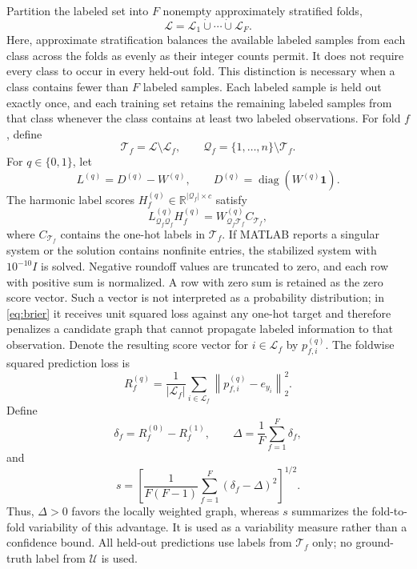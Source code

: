 \documentclass[11pt]{article}
\theoremstyle{remark}
\newcommand{\R}{\mathbb{R}}
\newcommand{\ones}{\mathbf{1}}
\begin{document}
Partition the labeled set into $F$ nonempty approximately stratified folds,
\[
\mathcal L=\mathcal L_1\mathbin{\dot\cup}\cdots\mathbin{\dot\cup}\mathcal L_F.
\]
Here, approximate stratification balances the available labeled samples from each class across the folds as evenly as their integer counts permit. It does not require every class to occur in every held-out fold. This distinction is necessary when a class contains fewer than $F$ labeled samples. Each labeled sample is held out exactly once, and each training set retains the remaining labeled samples from that class whenever the class contains at least two labeled observations.
For fold $f$, define
\[
\mathcal T_f=\mathcal L\setminus\mathcal L_f,
\qquad
\mathcal Q_f=\{1,\ldots,n\}\setminus\mathcal T_f.
\]
For $q\in\{0,1\}$, let
\[
L^{(q)}=D^{(q)}-W^{(q)},
\qquad
D^{(q)}=\operatorname{diag}(W^{(q)}\ones).
\]
The harmonic label scores $H_f^{(q)}\in\R^{|\mathcal Q_f|\times c}$ satisfy
\begin{equation}
\label{eq:harmonic}
L_{\mathcal Q_f\mathcal Q_f}^{(q)}H_f^{(q)}
=W_{\mathcal Q_f\mathcal T_f}^{(q)}C_{\mathcal T_f},
\end{equation}
where $C_{\mathcal T_f}$ contains the one-hot labels in $\mathcal T_f$. If MATLAB reports a singular system or the solution contains nonfinite entries, the stabilized system with $10^{-10}I$ is solved. Negative roundoff values are truncated to zero, and each row with positive sum is normalized. A row with zero sum is retained as the zero score vector. Such a vector is not interpreted as a probability distribution; in \eqref{eq:brier} it receives unit squared loss against any one-hot target and therefore penalizes a candidate graph that cannot propagate labeled information to that observation. Denote the resulting score vector for $i\in\mathcal L_f$ by $p_{f,i}^{(q)}$. The foldwise squared prediction loss is
\begin{equation}
\label{eq:brier}
R_f^{(q)}=
\frac{1}{|\mathcal L_f|}
\sum_{i\in\mathcal L_f}
\left\|p_{f,i}^{(q)}-e_{y_i}\right\|_2^2.
\end{equation}
Define
\begin{equation}
\label{eq:advantage}
\delta_f=R_f^{(0)}-R_f^{(1)},
\qquad
\Delta=\frac{1}{F}\sum_{f=1}^{F}\delta_f,
\end{equation}
and
\begin{equation}
\label{eq:standard_error}
s=\left[
\frac{1}{F(F-1)}
\sum_{f=1}^{F}(\delta_f-\Delta)^2
\right]^{1/2}.
\end{equation}
Thus, \(\Delta>0\) favors the locally weighted graph, whereas \(s\)
summarizes the fold-to-fold variability of this advantage. It is used
as a variability measure rather than a confidence bound. All held-out predictions use labels from $\mathcal T_f$ only; no ground-truth label from $\mathcal U$ is used.
\end{document}
